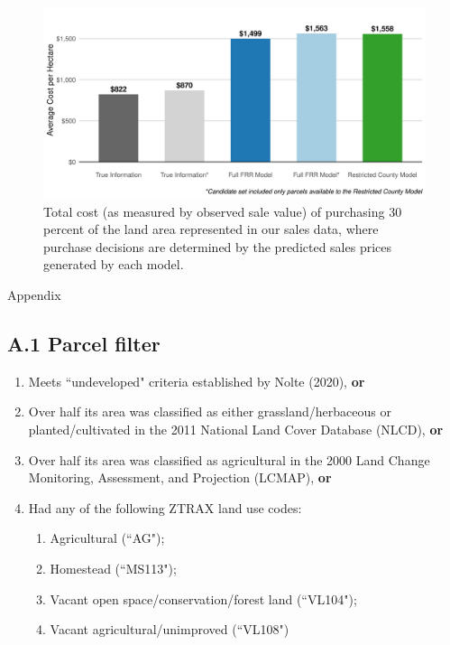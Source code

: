 \documentclass[12pt]{article}
\begin{document}
\begin{figure}[H]
    \centering
    \includegraphics[width=1\textwidth]{exhibits/cost_effective_30by30.png}
    \caption{Total cost (as measured by observed sale value) of purchasing 30 percent of the land area represented in our sales data, where purchase decisions are determined by the predicted sales prices generated by each model.}
    \label{fig:cost_effective_30by30}
\end{figure}



\newpage
\newpage

\vspace*{200pt}

\begin{huge}
    \begin{center}
        Appendix
    \end{center}
\end{huge}

\newpage

\subsection*{A.1 Parcel filter}

\begin{enumerate}
    \item Meets ``undeveloped" criteria established by Nolte (2020), \textbf{or}
    \item Over half its area was classified as either grassland/herbaceous or planted/cultivated in the 2011 National Land Cover Database (NLCD), \textbf{or}
    \item Over half its area was classified as agricultural in the 2000 Land Change Monitoring, Assessment, and Projection (LCMAP), \textbf{or}
    \item Had any of the following ZTRAX land use codes:
    \begin{enumerate}
        \item Agricultural (``AG");
        \item Homestead (``MS113");
        \item Vacant open space/conservation/forest land (``VL104");
        \item Vacant agricultural/unimproved (``VL108")
    \end{enumerate}
\end{enumerate}
\end{document}
